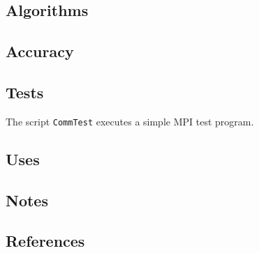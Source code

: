 \documentclass{article}
\begin{document}
\subsection{Algorithms}

\subsection{Accuracy}

\subsection{Tests}

The script \verb+CommTest+ executes a simple MPI test program.

\subsection{Uses}

\subsection{Notes}

\subsection{References}
\end{document}
